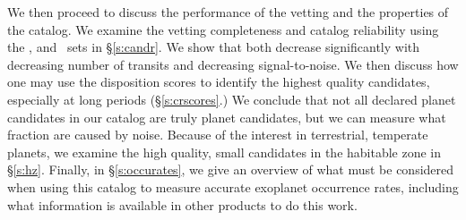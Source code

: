 We then proceed to discuss the performance of the vetting and the properties of the catalog. We examine the vetting completeness and catalog reliability using the \injtce, \invtce and \scrtce\ sets in \S\ref{s:candr}. We show that both decrease significantly with decreasing number of transits and decreasing signal-to-noise.  We then discuss how one may use the disposition scores to identify the highest quality candidates, especially at long periods (\S\ref{s:crscores}.)  We conclude that not all declared planet candidates in our catalog are truly planet candidates, but we can measure what fraction are caused by noise. Because of the interest in terrestrial, temperate planets, we examine the high quality, small candidates in the habitable zone in \S\ref{s:hz}. Finally, in \S\ref{s:occurates}, we give an overview of what must be considered when using this catalog to measure accurate exoplanet occurrence rates, including what information is available in other \Kepler{} products to do this work.





